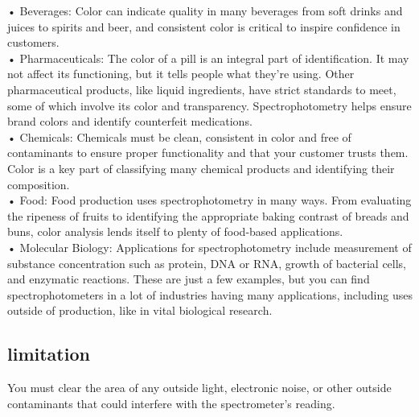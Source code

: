 \documentclass[12pt]{article}
\begin{document}
• Beverages: Color can indicate quality in many beverages from soft
drinks and juices to spirits and beer, and consistent color is critical to
inspire confidence in customers.\\
• Pharmaceuticals: The color of a pill is an integral part of identification.
It may not affect its functioning, but it tells people what they’re using. Other pharmaceutical products, like liquid ingredients, have strict
standards to meet, some of which involve its color and transparency.
Spectrophotometry helps ensure brand colors and identify counterfeit
medications.\\
• Chemicals: Chemicals must be clean, consistent in color and free of
contaminants to ensure proper functionality and that your customer
trusts them. Color is a key part of classifying many chemical products
and identifying their composition.\\
• Food: Food production uses spectrophotometry in many ways. From
evaluating the ripeness of fruits to identifying the appropriate baking
contrast of breads and buns, color analysis lends itself to plenty of
food-based applications.\\
• Molecular Biology: Applications for spectrophotometry include measurement of substance concentration such as protein, DNA or RNA,
growth of bacterial cells, and enzymatic reactions.
These are just a few examples, but you can find spectrophotometers in a lot
of industries having many applications, including uses outside of production,
like in vital biological research.
\subsection{limitation}
 You must clear the area of any outside light, electronic noise, or other outside contaminants that could interfere with the spectrometer's reading.
\end{document}
